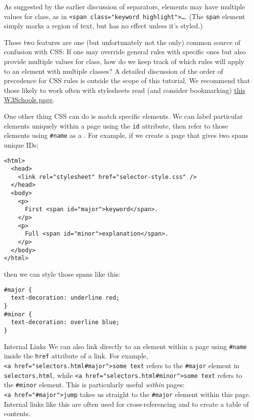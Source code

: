 As suggested by the earlier discussion of separators,
elements may have multiple values for class,
as in \texttt{{\textless}span\ class="keyword\ highlight"{\textgreater}{\ldots}}.
(The \texttt{span} element simply marks a region of text,
but has no effect unless it's styled.)

These two features are one
(but unfortunately not the only)
common source of confusion with CSS:
If one may override general rules with specific ones
but also provide multiple values for class,
how do we keep track of which rules will apply to an element with multiple classes?
A detailed discussion of the order of precedence for CSS rules
is outside the scope of this tutorial. We recommend that those
likely to work often with stylesheets read (and consider bookmarking)
\href{https://www.w3schools.com/css/css_specificity.asp}{this W3Schools page}.

One other thing CSS can do is match specific elements.
We can label particular elements uniquely within a page using the \texttt{id} attribute,
then refer to those elements using \texttt{\#name} as a .
For example,
if we create a page that gives two spans unique IDs:

\begin{verbatim}
<html>
  <head>
    <link rel="stylesheet" href="selector-style.css" />
  </head>
  <body>
    <p>
      First <span id="major">keyword</span>.
    </p>
    <p>
      Full <span id="minor">explanation</span>.
    </p>
  </body>
</html>
\end{verbatim}

\noindent
then we can style those spans like this:

\begin{verbatim}
#major {
  text-decoration: underline red;
}
#minor {
  text-decoration: overline blue;
}
\end{verbatim}

\begin{aside}{Internal Links}
  We can also link directly to an element within a page using \texttt{\#name}
  inside the \texttt{href} attribute of a link.
  For example,
  \texttt{{\textless}a\ href="selectors.html\#major"{\textgreater}some\ text}
  refers to the \texttt{\#major} element in \texttt{selectors.html},
  while \texttt{{\textless}a\ href="selectors.html\#minor"{\textgreater}some\ text}
  refers to the \texttt{\#minor} element.
  This is particularly useful \emph{within} pages:
  \texttt{{\textless}a\ href="\#major"{\textgreater}jump}
  takes us straight to the \texttt{\#major} element within this page.
  Internal links like this are often used for cross-referencing and to create a table of contents.
\end{aside}

